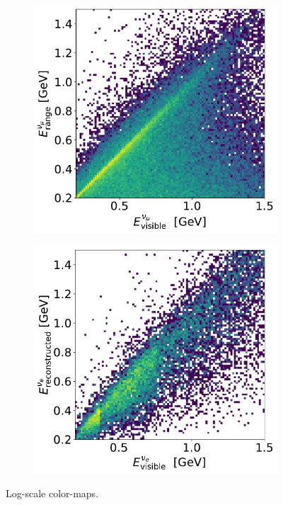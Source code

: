 \documentclass[a4paper]{article}
\begin{document}
\begin{figure}[H] 
\begin{center}
    \begin{subfigure}[b]{0.4\textwidth}
    \centering
    \includegraphics[width=1.00\textwidth]{ereco/numu_energy_visible_eres2D.pdf}
    \caption{\label{fig:eres:numu:2d} }
    \end{subfigure}
    \begin{subfigure}[b]{0.4\textwidth}
    \centering
    \includegraphics[width=1.00\textwidth]{ereco/nue_visible_eres2D.pdf}
    \caption{\label{fig:eres:nue:vstrue} }
    \end{subfigure}
\caption{\label{fig:eres:neutrino}Log-scale color-maps.}
\end{center}
\end{figure}
\end{document}

